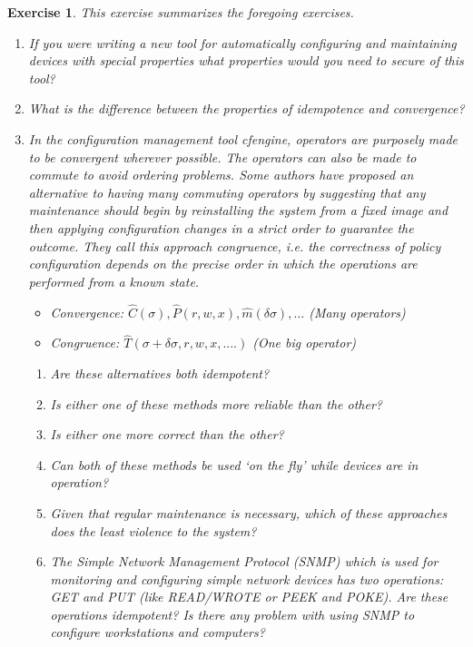 \documentclass{book}
\newtheorem{exercise}{Exercise}
\begin{document}
\begin{exercise}
This exercise summarizes the foregoing exercises.
\begin{enumerate}
\item If you were writing a new tool for automatically configuring
and maintaining devices with special properties what properties would you 
need to secure of this tool?

\item What is the difference between the properties of idempotence and
convergence?

\item In the configuration management tool cfengine, operators are
purposely made to be convergent wherever possible. The operators
can also be made to commute to avoid ordering problems.
Some authors have proposed an alternative to having many commuting
operators by suggesting that any maintenance should begin by
reinstalling the system from a fixed image and then applying configuration
changes in a strict order to guarantee the outcome. They call this
approach {\em congruence}, i.e. the correctness of policy configuration
depends on the precise order in which the operations are performed from
a known state.
\begin{itemize}
\item Convergence: $\hat C(\sigma), \hat P(r,w,x),\hat m(\delta\sigma), \ldots$ (Many operators)
\item Congruence: $\hat T(\sigma+\delta\sigma,r,w,x,....)$ (One big operator)
\end{itemize}
\begin{enumerate}
\item Are these alternatives both idempotent?
\item Is either one of these methods more reliable than the other? 
\item Is either one
more correct than the other? 
\item Can both of these methods be used
`on the fly' while devices are in operation?
\item Given that regular maintenance is necessary, which of these approaches
does the least violence to the system?

\item The Simple Network Management Protocol (SNMP) which is used for
monitoring and configuring simple network devices has two operations:
GET and PUT (like READ/WROTE or PEEK and POKE). Are these operations idempotent?
Is there any problem with using SNMP to configure workstations and
computers?
\end{enumerate}
\end{enumerate}
\end{exercise}
\begin{solution}
\end{solution}
\end{document}
